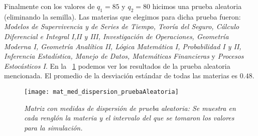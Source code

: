 Finalmente con los valores de $q_{1} = 85$ y $q_{2} = 80$ hicimos una prueba aleatoria (eliminando la semilla). Las materias que elegimos para dicha prueba fueron: \textit{Modelos de Supervivencia y de Series de Tiempo, Teoría del Seguro, Cálculo Diferencial e Integral I,II y III, Investigación de Operaciones, Geometría Moderna I, Geometría Analítica II, Lógica Matemática I, Probabilidad I y II, Inferencia Estadística, Manejo de Datos, Matemáticas Financieras} y \textit{Procesos Estocásticos I}. En la \figurename{~\ref{mat_med_dispersion_pruebaAl}} podemos ver los resultados de la prueba aleatoria mencionada. El promedio de la desviación estándar de todas las materias es $0.48$.%

\begin{figure}[H]
\centering
\texttt{[image: mat\_med\_dispersion\_pruebaAleatoria]} %
\caption[\textit{Matriz con medidas de dispersión de prueba aleatoria}]{\textit{Matriz con medidas de dispersión de prueba aleatoria: Se muestra en cada renglón la materia y el intervalo del que se tomaron los valores para la simulación.}}\label{mat_med_dispersion_pruebaAl}
\end{figure}
